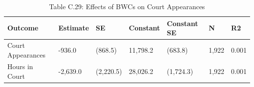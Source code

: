 \begin{table}

\caption{Table C.29: Effects of BWCs on Court Appearances}
\centering
\begin{tabular}[t]{lllllll}
\toprule
Outcome & Estimate & SE & Constant & Constant SE & N & R2\\
\midrule
Court Appearances & -936.0 & (868.5) & 11,798.2 & (683.8) & 1,922 & 0.001\\
Hours in Court & -2,639.0 & (2,220.5) & 28,026.2 & (1,724.3) & 1,922 & 0.001\\
\bottomrule
\end{tabular}
\end{table}
